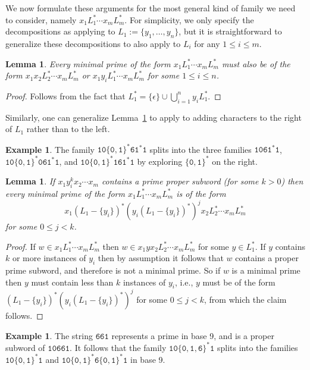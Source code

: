 \documentclass[12pt]{article}
\theoremstyle{plain}
\newtheorem{lemma}[theorem]{Lemma}
\theoremstyle{definition}
\newtheorem{example}[theorem]{Example}
\theoremstyle{remark}
\newcommand{\0}{\mathtt{0}}
\newcommand{\1}{\mathtt{1}}
\newcommand{\2}{\mathtt{2}}
\newcommand{\3}{\mathtt{3}}
\newcommand{\4}{\mathtt{4}}
\newcommand{\5}{\mathtt{5}}
\newcommand{\6}{\mathtt{6}}
\newcommand{\7}{\mathtt{7}}
\newcommand{\8}{\mathtt{8}}
\newcommand{\9}{\mathtt{9}}
\begin{document}
We now formulate these arguments for the most general kind of family we need to consider, namely
$x_1L_1^*\dotsm x_mL_m^*$.  For simplicity, we only specify the decompositions as applying to
$L_1:=\{y_1,\dotsc,y_n\}$, but it is straightforward to generalize these decompositions
to also apply to $L_i$ for any $1\leq i\leq m$.

\begin{lemma}\label{lemexplore}
Every minimal prime of the form $x_1L_1^*\dotsm x_mL_m^*$ must also be of the form
$x_1x_2L_2^*\dotsm x_mL_m^*$ or $x_1y_iL_1^*\dotsm x_mL_m^*$ for some $1\leq i\leq n$.
\end{lemma}
\begin{proof}
Follows from the fact that $L_1^*=\{\epsilon\}\cup\bigcup_{i=1}^n y_iL_1^*$.
\end{proof}
Similarly, one can generalize Lemma~\ref{lemexplore} to apply to adding characters to the right of $L_1$ rather than
to the left.
\begin{example}
The family $\1\0\{\0,\1\}^*\6\1^*\1$ splits into the three families $\1\0\6\1^*\1$, $\1\0\{\0,\1\}^*\0\6\1^*\1$, and $\1\0\{\0,\1\}^*\1\6\1^*\1$
by exploring $\{\0,\1\}^*$ on the right.
\end{example}

\begin{lemma}\label{lemsplit1}
If $x_1y_i^kx_2\dotsm x_m$ contains a prime proper subword (for some $k>0$) then every minimal prime of the form
$x_1L_1^*\dotsm x_mL_m^*$ is of the form \[x_1(L_1-\{y_i\})^*(y_i(L_1-\{y_i\})^*)^jx_2L_2^*\dotsm x_mL_m^*\]
for some $0\leq j<k$.
\end{lemma}
\begin{proof}
If $w\in x_1L_1^*\dotsm x_mL_m^*$ then $w\in x_1yx_2L_2^*\dotsm x_mL_m^*$ for some $y\in L_1^*$.
If $y$ contains $k$ or more instances of $y_i$ then by assumption it follows that $w$ contains a proper prime subword,
and therefore is not a minimal prime.  So if $w$ is a minimal prime then $y$ must contain less than $k$
instances of $y_i$, i.e., $y$ must be of the form $(L_1-\{y_i\})^*(y_i(L_1-\{y_i\})^*)^j$ for some $0\leq j<k$,
from which the claim follows.
\end{proof}
\begin{example}
The string $\6\6\1$ represents a prime in base 9, and is a proper subword of $\1\0\6\6\1$.  It follows that
the family $\1\0\{\0,\1,\6\}^*\1$ splits into the families
$\1\0\{\0,\1\}^*\1$ and $\1\0\{\0,\1\}^*\6\{\0,\1\}^*\1$ in base 9.
\end{example}
\end{document}
